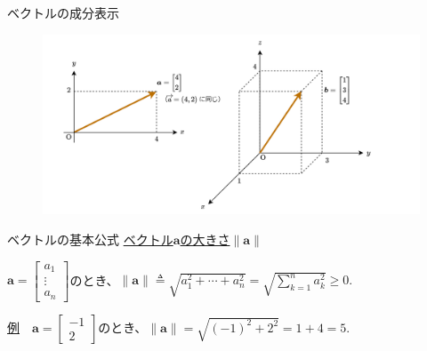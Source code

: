 \documentclass[dvipdfmx,aspectratio=169]{beamer}
\begin{document}
	\begin{frame}{ベクトルの成分表示}
		\begin{figure}
			\centering
			\includegraphics[width=0.9\linewidth]{img/component-display-of-vectors}
		\end{figure}
	\end{frame}
	\begin{frame}{ベクトルの基本公式}
		\underline{ベクトル$ \boldsymbol{a} $の大きさ$ \|\boldsymbol{a}\| $}
		
		$ \boldsymbol{a} = \begin{bmatrix}
			a_1\\
			\vdots\\
			a_n
		\end{bmatrix} $のとき、$ \|\boldsymbol{a}\| \triangleq \sqrt{a_1^2 + \cdots + a_n^2} = \sqrt{\displaystyle\sum_{k=1}^n a_k^2} \geq 0. $
	
		\underline{例}　$ \boldsymbol{a} = \begin{bmatrix}
			-1\\
			2
		\end{bmatrix} $のとき、$ \|\boldsymbol{a}\| = \sqrt{(-1)^2 + 2^2} = 1 + 4 = 5. $
	\end{frame}
\end{document}
